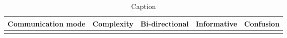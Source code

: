 \begin{table*}\centering
{}
\begin{tabular}{@{}lrrrr@{}}\toprule
Communication mode & Complexity & Bi-directional & Informative  & Confusion
\\\midrule
& \\

\bottomrule
\end{tabular}
\caption{Caption}
\end{table*}